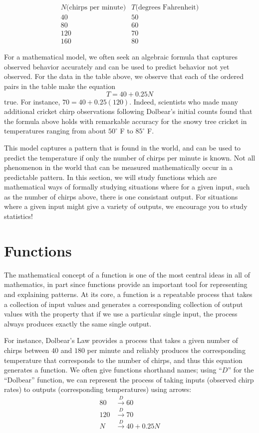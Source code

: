 \documentclass[noauthor, nooutcomes]{ximera}
\begin{document}
$$
\begin{array}{cc}
N \text{(chirps per minute)} & T \text{(degrees Fahrenheit)}\\
\hline
40&50\\
80&60\\
120&70\\
160&80
\end{array}
$$

For a mathematical model, we often seek an algebraic formula that captures observed behavior accurately and can be used to predict behavior not yet observed.  For the data in the table above, we observe that each of the ordered pairs in the table make the equation%
\begin{equation}
T = 40 + 0.25N
\end{equation}
true.  For instance, $70 = 40 + 0.25(120)$.  Indeed, scientists who made many additional cricket chirp observations following Dolbear's initial counts found that the formula above holds with remarkable accuracy for the snowy tree cricket in temperatures ranging from about $50^\circ$ F to $85^\circ$ F.

This model captures a pattern that is found in the world, and can be used to predict the temperature if only the number of chirps per minute is known.  Not all phenomenon in the world that can be measured mathematically occur in a predictable pattern.  In this section, we will study functions which are mathematical ways of formally studying situations where for a given input, such as the number of chirps above, there is one consistant output.  For situations where a given input might give a variety of outputs, we encourage you to study statistics!

\section{Functions}
The mathematical concept of a function is one of the most central ideas in all of mathematics, in part since functions provide an important tool for representing and explaining patterns.  At its core, a function is a repeatable process that takes a collection of input values and generates a corresponding collection of output values with the property that if we use a particular single input, the process always produces exactly the same single output.

For instance, Dolbear's Law provides a process that takes a given number of chirps between $40$ and $180$ per minute and reliably produces the corresponding temperature that corresponds to the number of chirps, and thus this equation generates a function.  We often give functions shorthand names; using ``$D$'' for the ``Dolbear'' function, we can represent the process of taking inputs (observed chirp rates) to outputs (corresponding temperatures) using arrows:%
\begin{align*}
80 &\xrightarrow{D} 60\\
120 &\xrightarrow{D} 70\\
N &\xrightarrow{D} 40 + 0.25 N
\end{align*}
\end{document}
